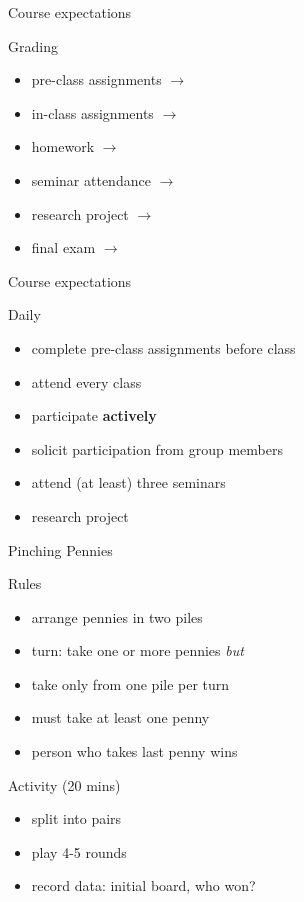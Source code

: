 \documentclass{beamer}
\begin{document}
\begin{frame}{Course expectations}
  \begin{block}{Grading}
    \begin{itemize}
      \item pre-class assignments $\rightarrow$ 
      \item in-class assignments $\rightarrow$ 
      \item homework $\rightarrow$ 
      \item seminar attendance $\rightarrow$ 
      \item research project $\rightarrow$ 
      \item final exam $\rightarrow$ 
    \end{itemize}
  \end{block}
\end{frame}

\begin{frame}{Course expectations}
  \begin{block}{Daily}
    \begin{itemize}
      \item complete pre-class assignments before class
      \item attend every class 
      \item participate \textbf{actively}
      \item solicit participation from group members
      \item attend (at least) three seminars
      \item research project
    \end{itemize}
  \end{block}
\end{frame}

\begin{frame}{Pinching Pennies}
  \begin{block}{Rules}
    \begin{itemize}
      \item arrange pennies in two piles
      \item turn: take one or more pennies \emph{but}
      \item take only from one pile per turn
      \item must take at least one penny
      \item person who takes last penny wins
    \end{itemize}
  \end{block}
  \begin{block}{Activity (20 mins)}
    \begin{itemize}
      \item split into pairs
      \item play 4-5 rounds
      \item {\color{red}record data:} initial board, who won? 
    \end{itemize}
  \end{block}
\end{frame}
\end{document}
